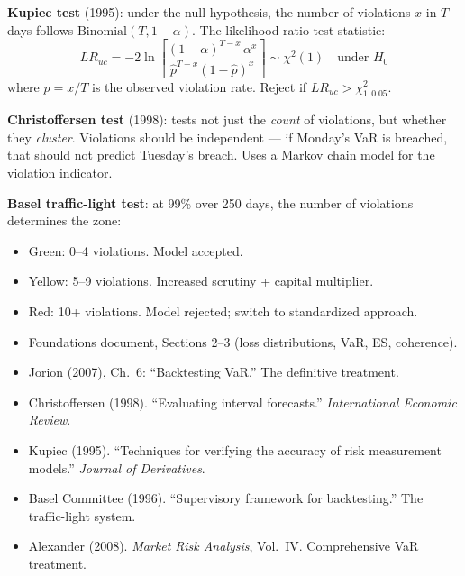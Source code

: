 \documentclass[11pt, a4paper]{article}
\begin{document}
\begin{keyidea}
\textbf{Kupiec test} (1995): under the null hypothesis, the number of violations $x$ in $T$ days follows $\text{Binomial}(T, 1-\alpha)$.
The likelihood ratio test statistic:
\[
    LR_{uc} = -2 \ln\!\left[\frac{(1-\alpha)^{T-x} \, \alpha^x}{\hat{p}^{T-x} (1-\hat{p})^x}\right]
    \sim \chi^2(1) \quad \text{under } H_0
\]
where $\hat{p} = x/T$ is the observed violation rate.
Reject if $LR_{uc} > \chi^2_{1, 0.05}$.

\medskip

\textbf{Christoffersen test} (1998): tests not just the \emph{count} of violations, but whether they \emph{cluster}.
Violations should be independent --- if Monday's VaR is breached, that should not predict Tuesday's breach.
Uses a Markov chain model for the violation indicator.

\medskip

\textbf{Basel traffic-light test}: at 99\% over 250 days, the number of violations determines the zone:
\begin{itemize}
    \item Green: 0--4 violations. Model accepted.
    \item Yellow: 5--9 violations. Increased scrutiny + capital multiplier.
    \item Red: 10+ violations. Model rejected; switch to standardized approach.
\end{itemize}
\end{keyidea}

\begin{prereq}
\begin{itemize}
    \item Foundations document, Sections 2--3 (loss distributions, VaR, ES, coherence).
    \item Jorion (2007), Ch.~6: ``Backtesting VaR.'' The definitive treatment.
    \item Christoffersen (1998). ``Evaluating interval forecasts.'' \emph{International Economic Review}.
\end{itemize}
\end{prereq}

\begin{refbox}
\begin{itemize}
    \item Kupiec (1995). ``Techniques for verifying the accuracy of risk measurement models.'' \emph{Journal of Derivatives}.
    \item Basel Committee (1996). ``Supervisory framework for backtesting.'' The traffic-light system.
    \item Alexander (2008). \emph{Market Risk Analysis}, Vol.~IV. Comprehensive VaR treatment.
\end{itemize}
\end{refbox}
\end{document}
